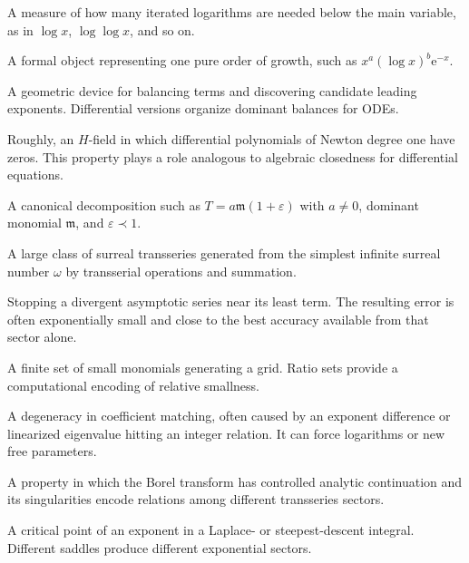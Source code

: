 \documentclass[11pt,openany]{book}
\theoremstyle{plain}
\theoremstyle{definition}
\theoremstyle{remark}
\newcommand{\m}{\mathfrak{m}}
\newcommand{\e}{\mathrm{e}}
\begin{document}
\begin{description}[style=nextline,itemsep=0.75em]
\item[Logarithmic depth]
A measure of how many iterated logarithms are needed below the main variable, as in $\log x$, $\log\log x$, and so on.

\item[Monomial]
A formal object representing one pure order of growth, such as $x^a(\log x)^b\e^{-x}$.

\item[Newton polygon]
A geometric device for balancing terms and discovering candidate leading exponents. Differential versions organize dominant balances for ODEs.

\item[Newtonian $H$-field]
Roughly, an $H$-field in which differential polynomials of Newton degree one have zeros. This property plays a role analogous to algebraic closedness for differential equations.

\item[Normal form]
A canonical decomposition such as $T=a\m(1+\varepsilon)$ with $a\ne0$, dominant monomial $\m$, and $\varepsilon\prec1$.

\item[Omega-series]
A large class of surreal transseries generated from the simplest infinite surreal number $\omega$ by transserial operations and summation.

\item[Optimal truncation]
Stopping a divergent asymptotic series near its least term. The resulting error is often exponentially small and close to the best accuracy available from that sector alone.

\item[Ratio set]
A finite set of small monomials generating a grid. Ratio sets provide a computational encoding of relative smallness.

\item[Resonance]
A degeneracy in coefficient matching, often caused by an exponent difference or linearized eigenvalue hitting an integer relation. It can force logarithms or new free parameters.

\item[Resurgence]
A property in which the Borel transform has controlled analytic continuation and its singularities encode relations among different transseries sectors.

\item[Saddle point]
A critical point of an exponent in a Laplace- or steepest-descent integral. Different saddles produce different exponential sectors.


\end{description}
\end{document}
